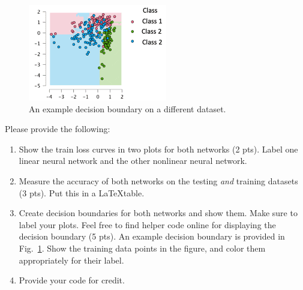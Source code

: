\documentclass[11pt, oneside]{article}   	%
\begin{document}
\begin{figure}
    \centering
    \includegraphics{example.png}
    \caption{An example decision boundary on a different dataset.}
    \label{fig:example}
\end{figure}


Please provide the following:
\begin{enumerate}
    \item Show the train loss curves in two plots for both networks (2 pts). Label one linear neural network and the other nonlinear neural network.
    \item Measure the accuracy of both networks on the testing \emph{and} training datasets (3 pts). Put this in a \LaTeX table.
    \item Create decision boundaries for both networks and show them. Make sure to label your plots. Feel free to find helper code online for displaying the decision boundary (5 pts). An example decision boundary is provided in Fig.~\ref{fig:example}. Show the training data points in the figure, and color them appropriately for their label.
    \item Provide your code for credit.
\end{enumerate}

\newpage
\end{document}
